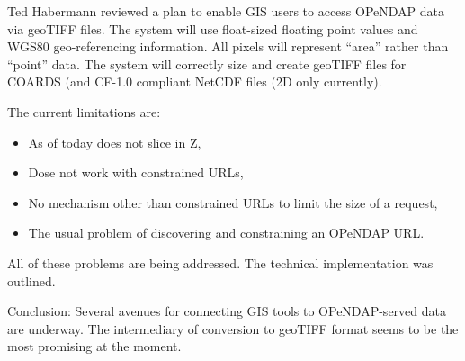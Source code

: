 Ted Habermann reviewed a plan to enable GIS users to access
OPeNDAP data via \ac{geoTIFF} files.  The system will use
float-sized floating point values and WGS80 geo-referencing
information.  All pixels will represent ``area'' rather than ``point''
data. The system will correctly size and create geoTIFF files for
\ac{COARDS} (and \ac{CF}-1.0 compliant NetCDF files (2D only currently).

The current limitations are:

\begin{itemize}
  \item As of today does not slice in Z,
  \item Dose not work with constrained URLs,
  \item No mechanism other than constrained URLs to limit the size
        of a request,
  \item The usual problem of discovering and constraining an OPeNDAP
         URL.
\end{itemize}

All of these problems are being addressed.
The technical implementation was outlined.

Conclusion: Several avenues for connecting GIS tools to OPeNDAP-served
data are underway.  The intermediary of conversion to \ac{geoTIFF}
format seems to be the most promising at the moment.
%
%
%
%
%

